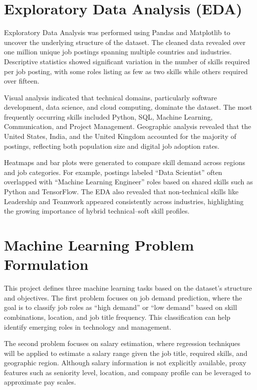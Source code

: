\documentclass[conference]{IEEEtran}
\begin{document}
\section{Exploratory Data Analysis (EDA)}
Exploratory Data Analysis was performed using Pandas and Matplotlib to uncover the underlying structure of the dataset. The cleaned data revealed over one million unique job postings spanning multiple countries and industries. Descriptive statistics showed significant variation in the number of skills required per job posting, with some roles listing as few as two skills while others required over fifteen.

Visual analysis indicated that technical domains, particularly software development, data science, and cloud computing, dominate the dataset. The most frequently occurring skills included Python, SQL, Machine Learning, Communication, and Project Management. Geographic analysis revealed that the United States, India, and the United Kingdom accounted for the majority of postings, reflecting both population size and digital job adoption rates.

Heatmaps and bar plots were generated to compare skill demand across regions and job categories. For example, postings labeled “Data Scientist” often overlapped with “Machine Learning Engineer” roles based on shared skills such as Python and TensorFlow. The EDA also revealed that non-technical skills like Leadership and Teamwork appeared consistently across industries, highlighting the growing importance of hybrid technical–soft skill profiles.

\section{Machine Learning Problem Formulation}
This project defines three machine learning tasks based on the dataset’s structure and objectives. The first problem focuses on job demand prediction, where the goal is to classify job roles as “high demand” or “low demand” based on skill combinations, location, and job title frequency. This classification can help identify emerging roles in technology and management.

The second problem focuses on salary estimation, where regression techniques will be applied to estimate a salary range given the job title, required skills, and geographic region. Although salary information is not explicitly available, proxy features such as seniority level, location, and company profile can be leveraged to approximate pay scales.
\end{document}
